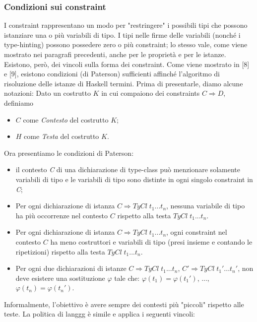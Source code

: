 \documentclass[10pt,a4paper]{article}
\begin{document}
\subsubsection{Condizioni sui constraint}
I constraint rappresentano un modo per "restringere" i possibili tipi che possono istanziare una o più variabili di
tipo. I tipi nelle firme delle variabili (nonché i type-hinting) possono possedere zero o più constraint; lo stesso
vale, come viene mostrato nei paragrafi precedenti, anche per le proprietà e per le istanze. Esistono, però, dei
vincoli sulla forma dei constraint. Come viene mostrato in [8] e [9], esistono condizioni (di Paterson) sufficienti
affinché l'algoritmo di risoluzione delle istanze di Haskell termini. Prima di presentarle, diamo alcune notazioni:
\newline Dato un costrutto $ K $ in cui compaiono dei constraints $ C \Rightarrow D $, definiamo
\begin{itemize}
    \item $ C $ come \textit{Contesto} del costrutto $ K $;
    \item $ H $ come \textit{Testa} del costrutto $ K $.
\end{itemize}
Ora presentiamo le condizioni di Paterson:
\begin{itemize}
    \item il contesto \textit{C} di una dichiarazione di type-class può menzionare solamente variabili di tipo e
    le variabili di tipo sono distinte in ogni singolo constraint in \textit{C};
    \item Per ogni dichiarazione di istanza $ C \Rightarrow TyCl \; t_1 ... t_n $, nessuna variabile di tipo ha
    più occorrenze nel contesto $ C $ rispetto alla testa $ TyCl \; t_1 ... t_n $.
    \item Per ogni dichiarazione di istanza $ C \Rightarrow TyCl \; t_1 ... t_n $, ogni constraint nel contesto
    $ C $ ha meno costruttori e variabili di tipo (presi insieme e contando le ripetizioni) rispetto alla testa
    $ TyCl \; t_1 ... t_n $.
    \item Per ogni due dichiarazioni di istanze $ C \Rightarrow TyCl \; t_1 ... t_n $,
    $ C' \Rightarrow TyCl \; t_1' ... t_n' $, non deve esistere una sostituzione $ \varphi $ tale che:
    $ \varphi(t_1) = \varphi(t_1') $, ..., $ \varphi(t_n) = \varphi(t_n') $.
\end{itemize}
Informalmente, l'obiettivo è avere sempre dei contesti più "piccoli" rispetto alle teste. La politica di langgg è
simile e applica i seguenti vincoli:
\end{document}
